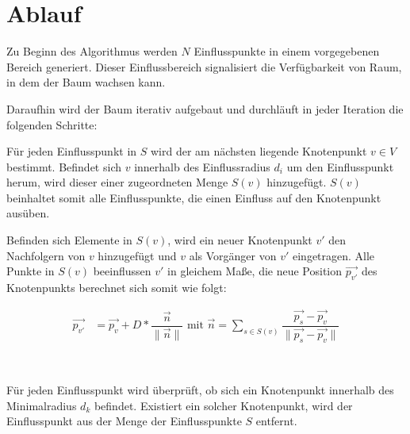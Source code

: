 \section{Ablauf}
\label{sec:SCA_Ablauf}
Zu Beginn des Algorithmus werden $N$ Einflusspunkte in einem vorgegebenen Bereich generiert. Dieser Einflussbereich signalisiert die Verfügbarkeit von Raum, in dem der Baum wachsen kann.  \cite[Abschn. 2]{SpaceColonizationAlgorithm:07}

Daraufhin wird der Baum iterativ aufgebaut und durchläuft in jeder Iteration die folgenden Schritte: 

\begin{description}[labelindent]
	\item[\boldmath$1.$] Für jeden Einflusspunkt in $S$ wird der am nächsten liegende Knotenpunkt $v\in V$ bestimmt. Befindet sich $v$ innerhalb des Einflussradius $d_i$ um den Einflusspunkt herum, wird dieser einer zugeordneten Menge $S(v)$ hinzugefügt. $S(v)$ beinhaltet somit alle Einflusspunkte, die einen Einfluss auf den Knotenpunkt ausüben. \cite[Abschn. 2]{SpaceColonizationAlgorithm:07} \label{alg:SCA_1}\\
	
	\item[\boldmath$2.$] Befinden sich Elemente in $S(v)$, wird ein neuer Knotenpunkt $v'$ den Nachfolgern von $v$ hinzugefügt und $v$ als Vorgänger von $v'$ eingetragen.  Alle Punkte in $S(v)$ beeinflussen $v'$ in gleichem Maße, die neue Position $\overrightarrow{p_{v'}}$ des Knotenpunkts berechnet sich somit wie folgt:
	
	\begin{equation}
	\begin{array}{ll}
	\overrightarrow{p_{v'}} & = \overrightarrow{p_v} + D * \dfrac{\overrightarrow{n} }{\lVert\overrightarrow{n}\rVert} \text{  mit  } \overrightarrow{n} = \sum\limits_{s \in S(v)}\dfrac{\overrightarrow{p_s} - \overrightarrow{p_v}}{\lVert \overrightarrow{p_s} - \overrightarrow{p_v} \rVert}
	\end{array}
	\end{equation} 
	
	\cite[Abschn. 2]{SpaceColonizationAlgorithm:07} \label{alg:SCA_2}\\
	
	\item[\boldmath$3.$] Für jeden Einflusspunkt wird überprüft, ob sich ein Knotenpunkt innerhalb des Minimalradius $d_k$ befindet. Existiert ein solcher Knotenpunkt, wird der Einflusspunkt aus der Menge der Einflusspunkte $S$ entfernt. \cite[Abschn. 2]{SpaceColonizationAlgorithm:07} \label{alg:SCA_3}
\end{description}

